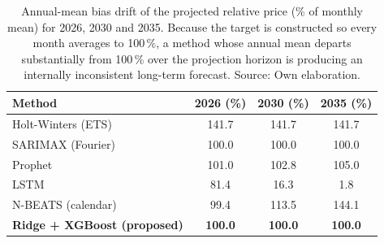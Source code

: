 \begin{table}[H]
    \centering
    \caption{Annual-mean bias drift of the projected relative price (\% of monthly mean) for 2026, 2030 and 2035. Because the target is constructed so every month averages to 100\,\%, a method whose annual mean departs substantially from 100\,\% over the projection horizon is producing an internally inconsistent long-term forecast. Source: Own elaboration.}
    \label{tab:stability_bias}
    \begin{tabular}{lccc}
        \toprule
        \textbf{Method} & \textbf{2026 (\%)} & \textbf{2030 (\%)} & \textbf{2035 (\%)} \\
        \midrule
        Holt-Winters (ETS) & 141.7 & 141.7 & 141.7 \\
        SARIMAX (Fourier) & 100.0 & 100.0 & 100.0 \\
        Prophet & 101.0 & 102.8 & 105.0 \\
        LSTM & 81.4 & 16.3 & 1.8 \\
        N-BEATS (calendar) & 99.4 & 113.5 & 144.1 \\
        \textbf{Ridge + XGBoost (proposed)} & \textbf{100.0} & \textbf{100.0} & \textbf{100.0} \\
        \bottomrule
    \end{tabular}
\end{table}